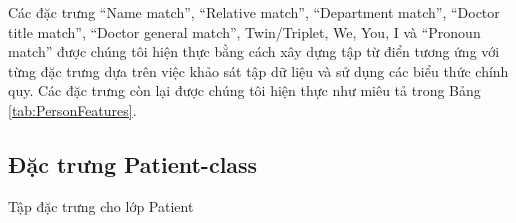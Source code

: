 Các đặc trưng ``Name match'', ``Relative match'', ``Department match'', ``Doctor title match'', ``Doctor general match'', Twin/Triplet, We, You, I và ``Pronoun match'' được chúng tôi hiện thực bằng cách xây dựng tập từ điển tương ứng với từng đặc trưng dựa trên việc khảo sát tập dữ liệu và sử dụng các biểu thức chính quy. Các đặc trưng còn lại được chúng tôi hiện thực như miêu tả trong Bảng \ref{tab:PersonFeatures}.

\subsection*{Đặc trưng Patient-class}
\begin{table}[t!]
\centering{}
\caption{Tập đặc trưng cho lớp Patient \label{tab:PatientFeatures}}
\footnotesize\sffamily


\end{table}
